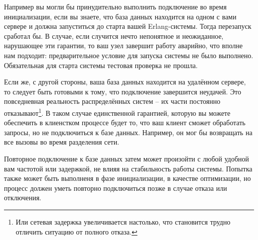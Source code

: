 \documentclass[11pt, oneside]{book}   	%
\begin{document}
Например вы могли бы принудительно выполнить подключение во время инициализации, если вы знаете, что база данных находится на одном с вами сервере и должна запуститься до старта вашей Erlang-системы. Тогда перезапуск сработал бы. В случае, если случится нечто непонятное и неожиданное, нарушающее эти гарантии, то ваш узел завершит работу аварийно, что вполне нам подходит: предварительное условие для запуска системы не было выполнено. Обязательная для старта системы тестовая проверка не прошла.

Если же, с другой стороны, ваша база данных находится на удалённом сервере, то следует быть готовыми к тому, что подключение завершится неудачей. Это повседневная реальность распределённых систем -- их части постоянно отказывают\footnote{Или сетевая задержка увеличивается настолько, что становится трудно отличить ситуацию от полного отказа.}. В таком случае единственной гарантией, которую вы можете обеспечить в клиенстком процессе будет то, что ваш клиент сможет обработать запросы, но не подключиться к базе данных. Например, он мог бы возвращать   на все вызовы во время разделения сети.

Повторное подключение к базе данных затем может произойти с любой удобной вам частотой или задержкой, не влияя на стабильность работы системы. Попытка также может быть выполненя в фазе инициализации, в качестве оптимизации, но процесс должен уметь повторно подключиться позже в случае отказа или отключения.
\end{document}
